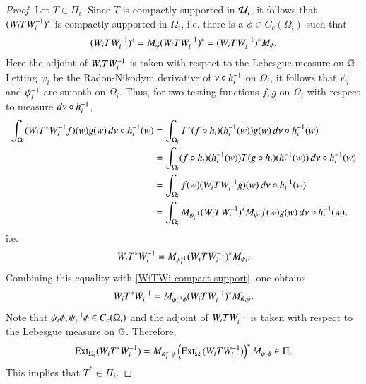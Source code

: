 \documentclass[leqno]{amsart}
\begin{document}
\begin{proof}
		Let $T\in\Pi_{i}$. Since $T$ is compactly supported in ${\mathcal U}_{i}$, it follows that $(W_{i}T W_{i}^{-1})^{*}$ is compactly supported in $\Omega_{i}$, i.e. there is a $\phi\in C_{c}(\Omega_{i})$ such that
		\begin{align}\label{WiTWi compact support}
			(W_{i}T W_{i}^{-1})^{*}=M_{\phi}(W_{i}T W_{i}^{-1})^{*}=(W_{i}T W_{i}^{-1})^{*}M_{\phi}.
		\end{align}
		Here the adjoint of $W_{i}T W_{i}^{-1}$ is taken with respect to the Lebesgue measure on $\mathbb{G}$.
		Letting $\psi_{i}$ be the Radon-Nikodym derivative of $\nu\circ h_{i}^{-1}$ on $\Omega_{i}$, it follows that $\psi_{i}$ and $\psi_{i}^{-1}$ are smooth on $\Omega_{i}$. Thus, for two testing functions $f,g$ on $\Omega_{i}$ with respect to measure $d\nu\circ h_{i}^{-1}$, 
		\begin{align*}
			\int_{\Omega_{i}}(W_{i}T^{*}W_{i}^{-1} f)(w)g(w) \,d\nu\circ h_{i}^{-1}(w)
			&=\int_{\Omega_{i}}T^{*}(f\circ h_{i})(h_{i}^{-1}(w))g(w)\,d\nu\circ h_{i}^{-1}(w)\\
			&=\int_{\Omega_{i}}(f\circ h_{i})(h_{i}^{-1}(w)) T(g\circ h_{i})(h_{i}^{-1}(w))\,d\nu\circ h_{i}^{-1}(w)\\
			&=\int_{\Omega_{i}}f(w) (W_{i}TW_{i}^{-1} g)(w)\,d\nu\circ h_{i}^{-1}(w)\\
			&=\int_{\Omega_{i}}M_{\psi_{i}^{-1}} (W_{i}TW_{i}^{-1})^{*} M_{\psi_{i}}f(w) g(w)\,d\nu\circ h_{i}^{-1}(w),
		\end{align*}
		i.e.
		\begin{align*}
			W_{i}T^{*} W_{i}^{-1}=M_{\psi_{i}^{-1}}(W_{i}T W_{i}^{-1})^{*}M_{\psi_{i}}.
		\end{align*}
		Combining this equality with \eqref{WiTWi compact support}, one obtains
		\begin{align*}
			W_{i}T^{*} W_{i}^{-1}=M_{\psi_{i}^{-1}\phi}(W_{i}T W_{i}^{-1})^{*}M_{\psi_{i}\phi}.
		\end{align*}
		Note that $\psi_{i}\phi,\psi_{i}^{-1}\phi\in C_{c}(\Omega_{i})$ and the adjoint of $W_{i}T W_{i}^{-1}$ is taken with respect to the Lebesgue measure on $\mathbb{G}$. Therefore,
		\begin{align}\label{*-Ext-commutative}
			{\rm Ext}_{\Omega_{i}}(W_{i}T^{*} W_{i}^{-1})
			=M_{\psi_{i}^{-1}\phi}\left({\rm Ext}_{\Omega_{i}}(W_{i}T W_{i}^{-1})\right)^{*}M_{\psi_{i}\phi}\in\Pi.
		\end{align}
		This implies that $T^{*}\in\Pi_{i}$.
		
		
		
		\bigskip
		

\end{proof}
\end{document}
